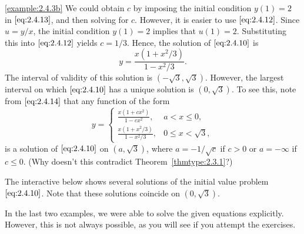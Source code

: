 \documentclass{ximera}
\begin{document}
\begin{example}
\begin{explanation}
\ref{example:2.4.3b}  We could obtain $c$ by imposing
the initial condition $y(1)=2$ in $\eqref{eq:2.4.13}$, and then solving for
$c$. However, it is easier to use $\eqref{eq:2.4.12}$. Since $u=y/x$, the
initial
condition
$y(1)=2$ implies that $u(1)=2$.  Substituting this into $\eqref{eq:2.4.12}$
yields $c=1/3$.  Hence, the solution of $\eqref{eq:2.4.10}$ is
$$
y=\frac{x(1+x^2/3)}{1-x^2/3}.
$$
The interval of validity of this solution is $(-\sqrt{3},\sqrt{3})$.
However, the largest interval on which $\eqref{eq:2.4.10}$ has a unique
solution is $(0,\sqrt{3})$. To see this, note from $\eqref{eq:2.4.14}$
that any function of the form
\begin{equation} \label{eq:2.4.15}
y=\left\{\begin{array}{ll} \frac{x(1+cx^2)}{1-cx^2},&a<x\leq 0,\\
\frac{x(1+x^2/3)}{1-x^2/3},&0\leq x<\sqrt{3},
\end{array}\right.
\end{equation}
is a solution of $\eqref{eq:2.4.10}$ on $(a,\sqrt{3})$, where $a=-1/\sqrt c$
if $c>0$ or $a=-\infty$ if $c\leq 0$. (Why doesn't this contradict
Theorem~\ref{thmtype:2.3.1}?)


The interactive below shows several solutions of the
initial value problem~$\eqref{eq:2.4.10}$. Note that these solutions coincide
on $(0,\sqrt{3})$.
\end{explanation}
\end{example}

\begin{center}
\end{center}

In the last two examples, we were able to solve the given equations
explicitly.   However, this is not  always possible, as you will
see if you attempt the exercises.
\end{document}
